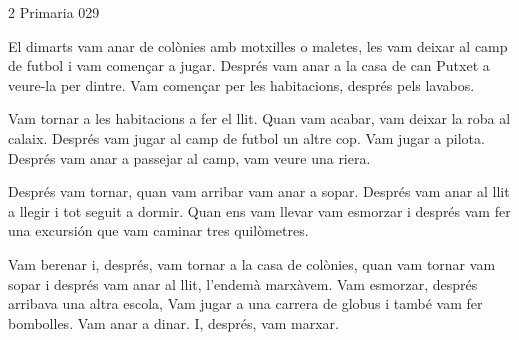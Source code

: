 \begin{news}
{2} %
{}
{}
{Primaria}
{029} %


El dimarts vam anar de colònies amb motxilles o maletes, les vam deixar al camp de futbol i vam començar a jugar. Després vam anar a la casa de can Putxet a veure-la per dintre. Vam començar per les habitacions, després pels lavabos. 

Vam tornar a les habitacions a fer el llit. Quan vam acabar, vam deixar la roba al calaix. Després vam jugar al camp de futbol un altre cop. Vam jugar a pilota. Després vam anar a passejar al camp, vam veure una riera.

Després vam tornar, quan vam arribar vam  anar a sopar. Després vam anar al llit a llegir i tot seguit a dormir. Quan ens vam llevar vam esmorzar i després vam fer una excursión que vam caminar tres quilòmetres. 

Vam berenar i, després, vam tornar a la casa de colònies, quan vam tornar vam sopar i després vam anar al llit, l’endemà marxàvem. Vam esmorzar, després arribava una altra escola, Vam jugar a una carrera de globus i també vam fer bombolles. 
Vam anar a dinar. I, després, vam marxar. 



\end{news}

